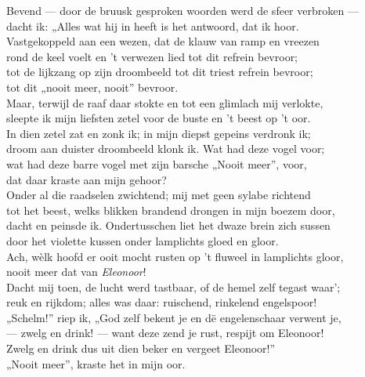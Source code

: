 \documentclass{memoir}
\begin{document}
\begin{multicols}{2}
\noindent Bevend — door de bruusk gesproken woorden werd de sfeer verbroken —\\
dacht ik: „Alles wat hij in heeft is het antwoord, dat ik hoor.\\
Vastgekoppeld aan een wezen, dat de klauw van ramp en vreezen\\
rond de keel voelt en 't verwezen lied tot dit refrein bevroor;\\
tot de lijkzang op zijn droombeeld tot dit triest refrein bevroor;\\
\indent\indent tot dit „nooit meer, nooit” bevroor.\\

\noindent Maar, terwijl de raaf daar stokte en tot een glimlach mij verlokte,\\
sleepte ik mijn liefsten zetel voor de buste en 't beest op 't oor.\\
In dien zetel zat en zonk ik; in mijn diepst gepeins verdronk ik;\\
droom aan duister droombeeld klonk ik. Wat had deze vogel voor;\\
wat had deze barre vogel met zijn barsche „Nooit meer”, voor,\\
\indent\indent dat daar kraste aan mijn gehoor?\\

\noindent Onder al die raadselen zwichtend; mij met geen sylabe richtend\\
tot het beest, welks blikken brandend drongen in mijn boezem door,\\
dacht en peinsde ik. Ondertusschen liet het dwaze brein zich sussen\\
door het violette kussen onder lamplichts gloed en gloor.\\
Ach, wèlk hoofd er ooit mocht rusten op 't fluweel in lamplichts gloor,\\
\indent\indent nooit meer dat van {\itshape Eleonoor}!\\

\noindent Dacht mij toen, de lucht werd tastbaar, of de hemel zelf tegast waar';\\
reuk en rijkdom; alles was daar: ruischend, rinkelend engelspoor!\\
„Schelm!” riep ik, „God zelf bekent je en dë engelenschaar verwent je,\\
— zwelg en drink! — want deze zend je rust, respijt om Eleonoor!\\
Zwelg en drink dus uit dien beker en vergeet Eleonoor!”\\
\indent\indent „Nooit meer”, kraste het in mijn oor.\\


\end{multicols}
\end{document}
